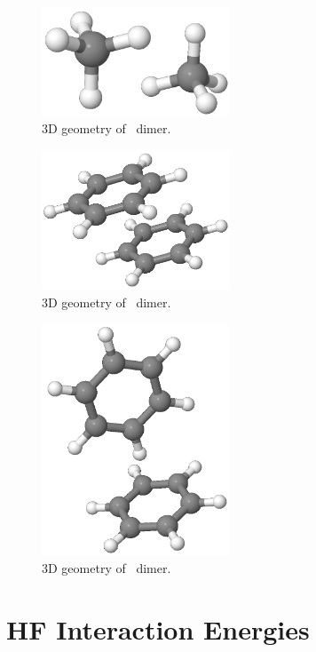 \begin{figure}[H]
\centering
\includegraphics[width = 0.5\textwidth]{figures/ch4.png}
\caption{3D geometry of \ch\ dimer.}
\end{figure}

\begin{figure}[H]
\centering
\includegraphics[width = 0.5\textwidth]{figures/benzene-parallel-displaced.png}
\caption{3D geometry of \benzpara\ dimer.}
\end{figure}

\begin{figure}[H]
\centering
\includegraphics[width = 0.5\textwidth]{figures/benzene-T-shaped.png}
\caption{3D geometry of \benzT\ dimer.}
\end{figure}

\section{HF Interaction Energies}

